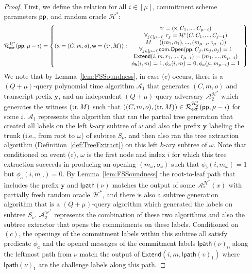 \begin{proof}
	 First, we define the relation for all $i \in [\mu]$, commitment scheme parameters $\textsf{pp}$, and random oracle $\mathcal{H}^*$: 
	 $$\mathcal{R}^{\mathcal{H^*}}_\textsf{ext}(\textsf{pp}, \mu - i) = \left\{(\mathsf{x} = (C, m, o), \mathsf{w} = (\textsf{{tr}}, M)): \begin{array}{c} \textsf{{tr}} = (\mathsf{x}, C_1,...,C_{\mu-i}) \\ \forall_{j \in [\mu-i]} \ r_j = \mathcal{H}^*(C,C_1,...,C_{j-1}) \\ M = ((m_1,o_1),...,(m_{\mu-i}, o_{\mu-i})) \\ \forall_{j \in [\mu-i]} \textsf{com}.\textsf{{Open}}(\textsf{pp},C_j, m_j, o_j) = 1 \\ \textsf{Extend}(i,m,r_1,...,r_{\mu-i}) = (m_1,...,m_{\mu - i}) \\ \phi_b(i,m) = 1, \phi_a(i, m) = 0, \phi_a(\mu, m_{\mu - i}) = 1  \end{array} \right\} $$
	 We note that by Lemma~\ref{lem:FSSoundness}, in case (c) occurs, there is a $(Q+\mu)$-query polynomial time algorithm $\mathcal{A}_1$ that generates $(C,m,o)$ and transcript prefix $\mathbf{y}$, and an independent $(Q + \mu)$-query adversary $\mathcal{A}_2^{\mathcal{H}^*}$ which generates the witness $(\textsf{{tr}}, M)$ such that $((C, m, o), (\textsf{{tr}}, M)) \in \mathcal{R}^{\mathcal{H}^*_\mathbf{y}}_\textsf{ext}(\textsf{pp}, \mu - i)$ for some $i$. $\mathcal{A}_1$ represents the algorithm that ran the partial tree generation that created all labels on the left $k$-ary subtree of $\omega$ and also the prefix $\mathbf{y}$ labeling the trunk (i.e., from root to $\omega$) of subtree $S_\nu$, and then also ran the tree extraction algorithm (Definition~\ref{def:TreeExtract}) on this left $k$-ary subtree of $\omega$. Note that conditioned on event (c), $\omega$ is the first node and index $i$ for which this tree extraction succeeds in producing an opening $(m_\omega, o_\omega)$ such that $\phi_b(i, m_\omega) = 1$ but $\phi_a(i, m_\omega) = 0$. By Lemma~\ref{lem:FSSoundness} the root-to-leaf path that includes the prefix $\mathbf{y}$ and $\textsf{lpath}(\nu)$ matches the output of some $\mathcal{A}_*^{\mathcal{H}^*}(x)$ with partially fresh random oracle $\mathcal{H}^*$, and there is also a subtree generation algorithm that is a $(Q+\mu)$-query algorithm which generated the labels on subtree $S_\nu$. $\mathcal{A}^{\mathcal{H}^*}_2$ represents the combination of these two algorithms and also the subtree extractor that opens the commitments on these labels. Conditioned on $(c)$, the openings of the commitment labels within this subtree all satisfy predicate $\phi_a$ and the opened messages of the commitment labels $\textsf{lpath}(\nu)_0$ along the leftmost path from $\nu$ match the output of $\textsf{Extend}(i, m, \textsf{lpath}(v)_1)$ where $\textsf{lpath}(\nu)_1$ are the challenge labels along this path. 
	 

\end{proof}

